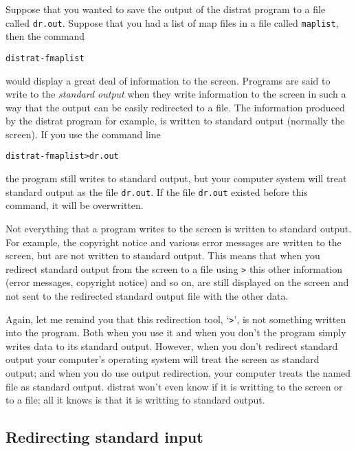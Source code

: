 \documentclass[%
	11pt,
        a4paper,
        twoside]{workrep}
\newcommand*{\prg}[1]{\textsf{#1}}		%
\newcommand*{\file}[1]{\texttt{#1}}		%
\newcommand*{\nt}[1]{\textit{#1}}		%
\begin{document}
Suppose that you wanted to save the output of the \prg{distrat} program
to a file called \file{dr.out}.  Suppose that you had a list of
map files in a file called \file{maplist}, then the command
\begin{alltt}
  distrat -f maplist
\end{alltt}
would display a great deal of information to the screen.  Programs
are said to write to the \nt{standard output} when they write information
to the screen in such a way that the output can be easily redirected
to a file.  The information produced by the \prg{distrat} program for
example, is written to standard output (normally the screen).  If you
use the command line
\begin{alltt}
  distrat -f maplist > dr.out
\end{alltt}
the program still writes to standard output, but your computer
system will treat standard output as the file \file{dr.out}.  If
the file \file{dr.out} existed before this command, it will be overwritten.

Not everything that a program writes to the screen is written to standard
output.  For example, the copyright notice and various error messages are
written to the screen, but are not written to standard output.  This
means that when you redirect standard output from the screen to
a file using \texttt{>} this other information (error messages, copyright
notice) and so on, are still displayed on the screen and not sent to
the redirected standard output file with the other data.

Again, let me remind you that this redirection tool, `\texttt{>}', is
not something written into the program.  Both when you use it and
when you don't the program simply writes data to its standard output.
However, when you don't redirect standard output your computer's
operating system will treat the screen as standard output; and when
you do use output redirection, your computer treats the named file
as standard output.  \prg{distrat} won't even know if it is writting
to the screen or to a file; all it knows is that it is writting to
standard output.

\subsection{Redirecting standard input}
\end{document}
